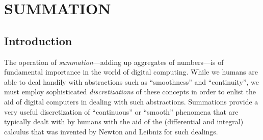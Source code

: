 
\chapter{SUMMATION}
\label{ch:Summation}


\section{Introduction}
\label{sec:intro}

The operation of {\it summation}---adding up aggregates of
numbers---is of fundamental importance in the world of digital
computing.  While we humans are able to deal handily with abstractions
such as ``smoothness'' and ``continuity'', we must employ
sophisticated {\em discretizations} of these concepts in order to
enlist the aid of digital computers in dealing with such abstractions.
Summations provide a very useful discretization of ``continuous'' or
``smooth'' phenomena that are typically dealt with by humans with the
aid of the (differential and integral) calculus that was invented by
Newton and Leibniz for such dealings.

